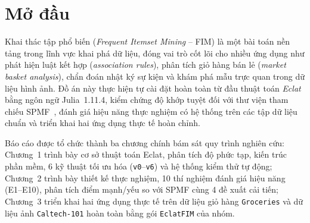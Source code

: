 \section{Mở đầu}
\label{sec:01_introduction}

Khai thác tập phổ biến (\emph{Frequent Itemset Mining} -- FIM) là một bài toán nền tảng trong lĩnh vực khai phá dữ liệu, đóng vai trò cốt lõi cho nhiều ứng dụng như phát hiện luật kết hợp (\emph{association rules}), phân tích giỏ hàng bán lẻ (\emph{market basket analysis}), chẩn đoán nhật ký sự kiện và khám phá mẫu trực quan trong dữ liệu hình ảnh. Đồ án này thực hiện tự cài đặt hoàn toàn từ đầu thuật toán \emph{Eclat}~\cite{zaki2000scalable} bằng ngôn ngữ Julia~1.11.4, kiểm chứng độ khớp tuyệt đối với thư viện tham chiếu SPMF~\cite{fournier2014spmf}, đánh giá hiệu năng thực nghiệm có hệ thống trên các tập dữ liệu chuẩn và triển khai hai ứng dụng thực tế hoàn chỉnh.

Báo cáo được tổ chức thành ba chương chính bám sát quy trình nghiên cứu: Chương~1 trình bày cơ sở thuật toán Eclat, phân tích độ phức tạp, kiến trúc phần mềm, 6 kỹ thuật tối ưu hóa (\texttt{v0}--\texttt{v6}) và hệ thống kiểm thử tự động; Chương~2 trình bày thiết kế thực nghiệm, 10 thí nghiệm đánh giá hiệu năng (E1--E10), phân tích điểm mạnh/yếu so với SPMF cùng 4 đề xuất cải tiến; Chương~3 triển khai hai ứng dụng thực tế trên dữ liệu giỏ hàng \texttt{Groceries} và dữ liệu ảnh \texttt{Caltech-101} hoàn toàn bằng gói \texttt{EclatFIM} của nhóm.
